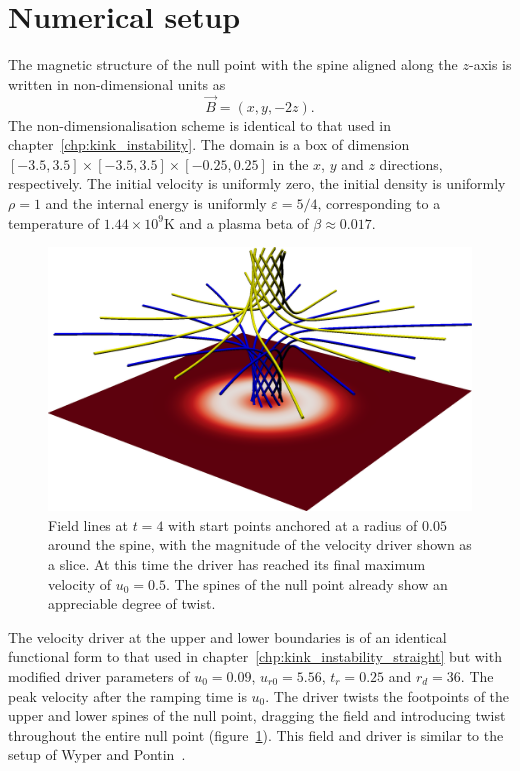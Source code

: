 \section{Numerical setup}

\label{sec:khi_numerical_setup}

The magnetic structure of the null point with the spine aligned along the $z$-axis is written in non-dimensional units as
\begin{equation}
  \label{eq:null_point_field}
  \vec{B} = (x, y, -2z).
\end{equation}
The non-dimensionalisation scheme is identical to that used in chapter~\ref{chp:kink_instability}. The domain is a box of dimension $[-3.5, 3.5]\times[-3.5, 3.5]\times [-0.25, 0.25] $ in the $x$, $y$ and $z$ directions, respectively. The initial velocity is uniformly zero, the initial density is uniformly $\rho = 1$ and the internal energy is uniformly $\varepsilon = 5/4$, corresponding to a temperature of $1.44 \times 10^9$K and a plasma beta of $\beta \approx 0.017$.

\begin{figure}[t]
  \centering
      \includegraphics[width=0.5\linewidth]{field_line_plots/cropped/v-4r-4-isotropic_0008_cropped.png}
  \caption{Field lines at $t=4$ with start points anchored at a radius of $0.05$ around the spine, with the magnitude of the velocity driver shown as a slice. At this time the driver has reached its final maximum velocity of $u_0 = 0.5$. The spines of the null point already show an appreciable degree of twist.}%
  \label{fig:field_line_plots/v-4r-4-iso-field-8}
\end{figure}

The velocity driver at the upper and lower boundaries is of an identical functional form to that used in chapter~\ref{chp:kink_instability_straight} but with modified driver parameters of $u_0 = 0.09$, $u_{r0} = 5.56$, $t_r = 0.25$ and $r_d = 36$. The peak velocity after the ramping time is $u_0$. The driver twists the footpoints of the upper and lower spines of the null point, dragging the field and introducing twist throughout the entire null point (figure~\ref{fig:field_line_plots/v-4r-4-iso-field-8}). This field and driver is similar to the setup of Wyper and Pontin~\cite{wyperKelvinHelmholtzInstabilityCurrentvortex2013}.

